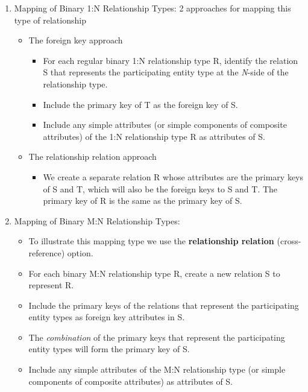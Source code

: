 \documentclass[10pt]{article}
\newcommand{\tf}{\textbf}
\newcommand{\ti}{\textit}
\begin{document}
\begin{enumerate}
	\item Mapping of Binary 1:N Relationship Types: 2 approaches for mapping this type of relationship
		\begin{itemize}
			\item The foreign key approach
			\begin{itemize}
				\item For each regular binary 1:N relationship type R, identify the relation S that represents the participating entity type at the \ti{N}-side of the relationship type.
				\item Include the primary key of T as the foreign key of S.
				\item Include any simple attributes (or simple components of composite attributes) of the 1:N relationship type R as attributes of S.
			\end{itemize}

			\item The relationship relation approach
				\begin{itemize}
					\item We create a separate relation R whose attributes are the primary keys of S and T, which will also be the foreign keys to S and T. The primary key of R is the same as the primary key of S.
				\end{itemize}
		\end{itemize}

	\item Mapping of Binary M:N Relationship Types:
		\begin{itemize}
			\item To illustrate this mapping type we use the \tf{relationship relation} (cross-reference) option.
			\item For each binary M:N relationship type R, create a new relation S to represent R.
			\item Include the primary keys of the relations that represent the participating entity types as  foreign key attributes in S.
			\item The \ti{combination} of the primary keys that represent the participating entity types will form the primary key of S.
			\item Include any simple attributes of the M:N relationship type (or simple components of composite attributes) as attributes of S.
		\end{itemize}


\end{enumerate}
\end{document}
